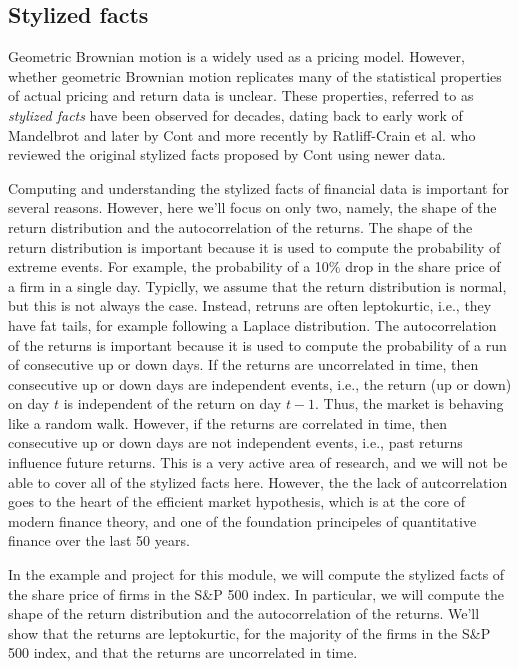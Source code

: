 \documentclass[11pt]{article}
\theoremstyle{definition}
\begin{document}
\subsection{Stylized facts}
Geometric Brownian motion is a widely used as a pricing model. 
However, whether geometric Brownian motion replicates many of the statistical properties of actual pricing and return data is unclear. 
These properties, referred to as \textit{stylized facts} have been observed for decades, 
dating back to early work of Mandelbrot \cite{Mandelbrot-1963,Mandelbrot-1967} and later by Cont \cite{Cont-QuantFinance-2001} 
and more recently by Ratliff-Crain et al. \cite{ratliffcrain2023revisiting} who reviewed the original stylized facts 
proposed by Cont using newer data.

Computing and understanding the stylized facts of financial data is important for several reasons. 
However, here we'll focus on only two, namely, the shape of the return distribution and the autocorrelation of the returns.
The shape of the return distribution is important because it is used to compute the probability of extreme events.
For example, the probability of a 10\% drop in the share price of a firm in a single day. 
Typiclly, we assume that the return distribution is normal, but this is not always the case. 
Instead, retruns are often leptokurtic, i.e., they have fat tails, for example following a Laplace distribution.
The autocorrelation of the returns is important because it is used to compute the probability of a run of consecutive up or down days.
If the returns are uncorrelated in time, then consecutive up or down days are independent events, i.e., 
the return (up or down) on day $t$ is independent of the return on day $t-1$. Thus, the market is behaving like a random walk.
However, if the returns are correlated in time, then consecutive up or down days are not independent events, i.e., 
past returns influence future returns. This is a very active area of research, and we will not be able to cover all of the stylized facts here. However, the 
the lack of autcorrelation goes to the heart of the efficient market hypothesis, which is at the core of modern finance theory, 
and one of the foundation principeles of quantitative finance over the last 50 years.

In the example and project for this module, we will compute the stylized facts of the share price of firms in the S\&P 500 index.
In particular, we will compute the shape of the return distribution and the autocorrelation of the returns. 
We'll show that the returns are leptokurtic, for the majority of the firms in the S\&P 500 index, and that the returns are uncorrelated in time.
\end{document}
